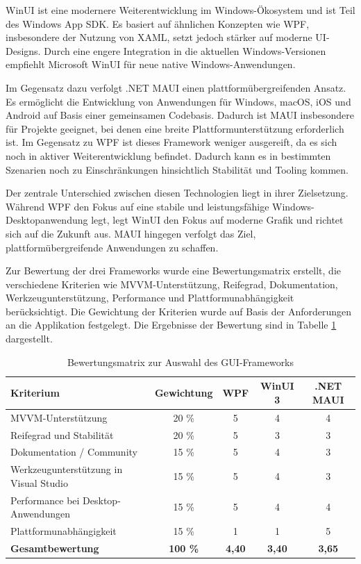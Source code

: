         WinUI ist eine modernere Weiterentwicklung im Windows-Ökosystem und ist Teil des Windows App SDK. Es basiert auf ähnlichen Konzepten
        wie WPF, insbesondere der Nutzung von XAML, setzt jedoch stärker auf moderne UI-Designs. Durch eine engere Integration in die aktuellen Windows-Versionen
        empfiehlt Microsoft WinUI für neue native Windows-Anwendungen. \autocite{XAMLMitWPF}

        Im Gegensatz dazu verfolgt .NET MAUI einen plattformübergreifenden Ansatz. Es ermöglicht die Entwicklung von Anwendungen für 
        Windows, macOS, iOS und Android auf Basis einer gemeinsamen Codebasis. Dadurch ist MAUI insbesondere für Projekte geeignet, bei denen eine breite Plattformunterstützung 
        erforderlich ist. Im Gegensatz zu WPF ist dieses Framework weniger ausgereift, da es sich noch in aktiver Weiterentwicklung befindet. Dadurch 
        kann es in bestimmten Szenarien noch zu Einschränkungen hinsichtlich Stabilität und Tooling kommen. \autocite{XAMLMitWPF}

        Der zentrale Unterschied zwischen diesen Technologien liegt in ihrer Zielsetzung. Während WPF den Fokus auf eine stabile und leistungsfähige Windows-Desktopanwendung legt,
        legt WinUI den Fokus auf moderne Grafik und richtet sich auf die Zukunft aus. MAUI hingegen verfolgt das Ziel, plattformübergreifende Anwendungen zu schaffen. \autocite{XAMLMitWPF}

        Zur Bewertung der drei Frameworks wurde eine Bewertungsmatrix erstellt, die verschiedene Kriterien wie MVVM-Unterstützung, Reifegrad, Dokumentation, Werkzeugunterstützung, Performance und Plattformunabhängigkeit berücksichtigt. Die Gewichtung der Kriterien wurde auf Basis der Anforderungen an die Applikation festgelegt. Die Ergebnisse der Bewertung sind in Tabelle \ref{tab:gui_bewertung} dargestellt.
        
        \begin{table}[htbp] 
            \centering 
            \caption{Bewertungsmatrix zur Auswahl des GUI-Frameworks} \label{tab:gui_bewertung} 
            \begin{tabular}{lcccc} 
                \toprule \textbf{Kriterium} & \textbf{Gewichtung} & \textbf{WPF} & \textbf{WinUI 3} & \textbf{.NET MAUI} \\ 
                \midrule MVVM-Unterstützung & 20 \% & 5 & 4 & 4 \\ 
                Reifegrad und Stabilität & 20 \% & 5 & 3 & 3 \\ 
                Dokumentation / Community & 15 \% & 5 & 4 & 3 \\ 
                Werkzeugunterstützung in Visual Studio & 15 \% & 5 & 4 & 3 \\ 
                Performance bei Desktop-Anwendungen & 15 \% & 5 & 4 & 4 \\ 
                Plattformunabhängigkeit & 15 \% & 1 & 1 & 5 \\ 
                \midrule \textbf{Gesamtbewertung} & \textbf{100 \%} & \textbf{4,40} & \textbf{3,40} & \textbf{3,65} \\ 
            \bottomrule \end{tabular} 
        \end{table}

